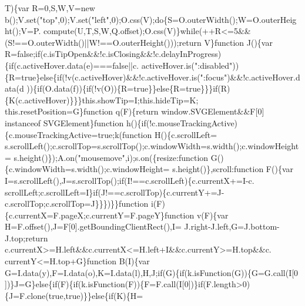 \begin{DoxyCode}
{      T)\{var R=0,S,W,V=\textcolor{keyword}{new} b();V.set(\textcolor{stringliteral}{"top"},0);V.set(\textcolor{stringliteral}{"left"},0);O.css(V);\textcolor{keywordflow}{do}\{S=O.outerWidth();W=O.outerHeight();V=P.
      compute(U,T,S,W,Q.offset);O.css(V)\}\textcolor{keywordflow}{while}(++R<=5&&(S!==O.outerWidth()||W!==O.outerHeight()));\textcolor{keywordflow}{return} V\}\textcolor{keyword}{function}
       J()\{var R=\textcolor{keyword}{false};\textcolor{keywordflow}{if}(c.isTipOpen&&!c.isClosing&&!c.delayInProgress)\{\textcolor{keywordflow}{if}(c.activeHover.data(e)===\textcolor{keyword}{false}||c.
      activeHover.is(\textcolor{stringliteral}{":disabled"}))\{R=\textcolor{keyword}{true}\}\textcolor{keywordflow}{else}\{\textcolor{keywordflow}{if}(!v(c.activeHover)&&!c.activeHover.is(\textcolor{stringliteral}{":focus"})&&!c.activeHover.data(d
      ))\{\textcolor{keywordflow}{if}(O.data(f))\{\textcolor{keywordflow}{if}(!v(O))\{R=\textcolor{keyword}{true}\}\}\textcolor{keywordflow}{else}\{R=\textcolor{keyword}{true}\}\}\}\textcolor{keywordflow}{if}(R)\{K(c.activeHover)\}\}\}this.showTip=I;this.hideTip=K;
      this.resetPosition=G\}\textcolor{keyword}{function} q(F)\{\textcolor{keywordflow}{return} window.SVGElement&&F[0] instanceof SVGElement\}\textcolor{keyword}{function} 
      h()\{\textcolor{keywordflow}{if}(!c.mouseTrackingActive)\{c.mouseTrackingActive=\textcolor{keyword}{true};k(\textcolor{keyword}{function} H()\{c.scrollLeft=
      s.scrollLeft();c.scrollTop=s.scrollTop();c.windowWidth=s.width();c.windowHeight=
      s.height()\});A.on(\textcolor{stringliteral}{"mousemove"},i);s.on(\{resize:\textcolor{keyword}{function} G()\{c.windowWidth=s.width();c.windowHeight=
      s.height()\},scroll:\textcolor{keyword}{function} F()\{var I=s.scrollLeft(),J=s.scrollTop();\textcolor{keywordflow}{if}(I!==c.scrollLeft)\{c.currentX+=I-c.
      scrollLeft;c.scrollLeft=I\}\textcolor{keywordflow}{if}(J!==c.scrollTop)\{c.currentY+=J-c.scrollTop;c.scrollTop=J\}\}\})\}\}\textcolor{keyword}{function} 
      i(F)\{c.currentX=F.pageX;c.currentY=F.pageY\}\textcolor{keyword}{function} v(F)\{var H=F.offset(),J=F[0].getBoundingClientRect(),I=
      J.right-J.left,G=J.bottom-J.top;\textcolor{keywordflow}{return} c.currentX>=H.left&&c.currentX<=H.left+I&&c.currentY>=H.top&&c.
      currentY<=H.top+G\}\textcolor{keyword}{function} B(I)\{var G=I.data(y),F=I.data(o),K=I.data(l),H,J;\textcolor{keywordflow}{if}(G)\{\textcolor{keywordflow}{if}(k.isFunction(G))\{G=G.call(I[0
      ])\}J=G\}\textcolor{keywordflow}{else}\{\textcolor{keywordflow}{if}(F)\{\textcolor{keywordflow}{if}(k.isFunction(F))\{F=F.call(I[0])\}\textcolor{keywordflow}{if}(F.length>0)\{J=F.clone(\textcolor{keyword}{true},\textcolor{keyword}{true})\}\}\textcolor{keywordflow}{else}\{\textcolor{keywordflow}{if}(K)\{H=
}
\end{DoxyCode}

